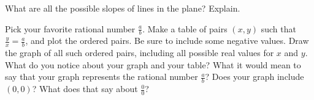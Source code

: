 \begin{prob}  What are all the possible slopes of lines in the plane?  Explain.  

\end{prob}
\begin{prob}  Pick your favorite rational number $\frac{a}{b}$.  Make a table of pairs $(x, y)$ such that $\frac{y}{x}=\frac{a}{b}$, and plot the ordered pairs.  Be sure to include some negative values.  Draw the graph of all such ordered pairs, including all possible real values for $x$ and $y$.  What do you notice about your graph and your table?  What it would mean to say that your graph represents the rational number $\frac{a}{b}$?  Does your graph include $(0, 0)$?  What does that say about $\frac{0}{0}$?  

\end{prob}

